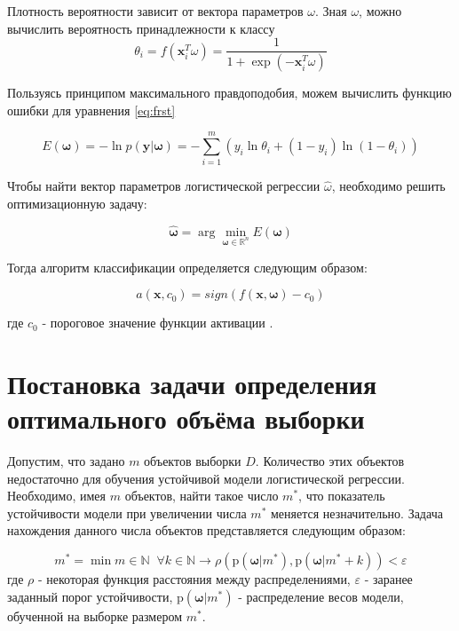 \documentclass[12pt,twoside]{article}
\begin{document}
Плотность вероятности зависит от вектора параметров $\omega$. Зная $\omega$, можно вычислить вероятность принадлежности к классу 
\begin{equation}\label{eq:scnd}
\theta _ { i } = f \left( \mathbf { x } _ { i } ^ { T } \omega \right) = \frac { 1 } { 1 + \exp \left( - \mathbf { x } _ { i } ^ { T } \omega \right) }
\end{equation}

Пользуясь принципом максимального правдоподобия, можем вычислить функцию ошибки для уравнения \eqref{eq:frst}

\begin{equation}\label{eq:trd}
E ( \boldsymbol { \omega } ) = - \ln p ( \mathbf { y } | \boldsymbol { \omega } ) = - \sum _ { i = 1 } ^ { m } \left( y _ { i } \ln \theta _ { i } + \left( 1 - y _ { i } \right) \ln \left( 1 - \theta _ { i } \right) \right)
\end{equation}

Чтобы найти вектор параметров логистической регрессии $\widehat { \omega }$, необходимо решить оптимизационную задачу:

\begin{equation}\label{eq:frth}
\hat { \mathbf { \omega } } = \arg \min _ { \mathbf { \omega } \in \mathbb { R } ^ { n } } E ( \mathbf { \omega } )
\end{equation}

Тогда алгоритм классификации определяется следующим образом:

\begin{equation}\label{eq:fvth}
a \left( \mathbf { x } , c _ { 0 } \right) = { sign } \left( f ( \mathbf { x } , \mathbf { \omega } ) - c _ { 0 } \right)
\end{equation}

где $c _ { 0 }$ - пороговое значение функции активации\cite{motrenko2014sample} .

\section{Постановка задачи определения оптимального объёма выборки}
Допустим, что задано $m$ объектов выборки $D$. Количество этих объектов недостаточно для обучения устойчивой модели логистической регрессии. Необходимо, имея $m$ объектов, найти такое число $m^ { * } $, что показатель устойчивости модели при увеличении числа $m^ { * } $ меняется незначительно. Задача нахождения данного числа объектов представляется следующим образом:

\begin{equation}\label{eq:sxth}
m ^ { * } = \min m \in \mathbb { N } \; \;  \forall  k \in \mathbb { N } \rightarrow \rho ( \mathrm { p } ( \boldsymbol { \omega } | m ^ {*} ) , \mathrm { p } ( \boldsymbol { \omega } | m ^ {*} + k ) ) < \varepsilon
\end{equation}
где $\rho$ - некоторая функция расстояния между распределениями, $\varepsilon$ - заранее заданный порог устойчивости, $\mathrm { p } ( \boldsymbol { \omega } | m ^ {*} )$
- распределение весов модели, обученной на выборке размером $m^{*}$.
\end{document}
